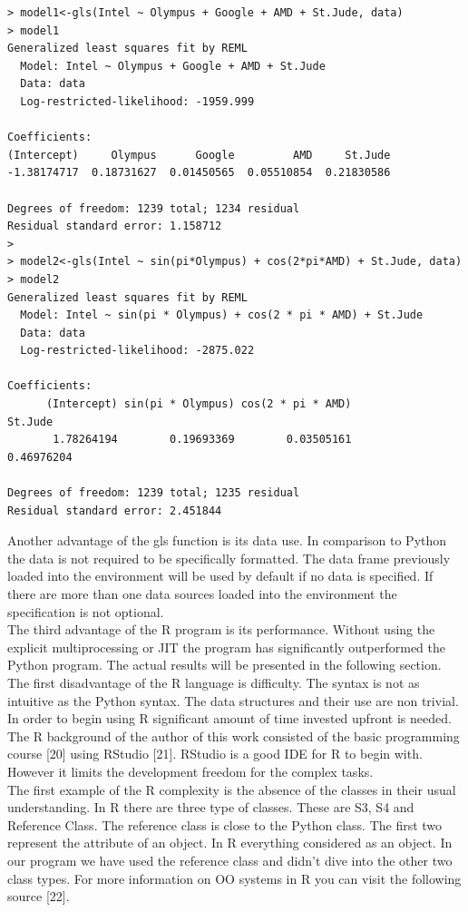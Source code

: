 \documentclass[
  twoside,
  12pt, a4paper,
  footinclude=true,
  headinclude=true,
  cleardoublepage=empty
]{article}
\begin{document}
\begin{verbatim}
> model1<-gls(Intel ~ Olympus + Google + AMD + St.Jude, data)
> model1
Generalized least squares fit by REML
  Model: Intel ~ Olympus + Google + AMD + St.Jude 
  Data: data 
  Log-restricted-likelihood: -1959.999

Coefficients:
(Intercept)     Olympus      Google         AMD     St.Jude 
-1.38174717  0.18731627  0.01450565  0.05510854  0.21830586 

Degrees of freedom: 1239 total; 1234 residual
Residual standard error: 1.158712
>
> model2<-gls(Intel ~ sin(pi*Olympus) + cos(2*pi*AMD) + St.Jude, data)
> model2
Generalized least squares fit by REML
  Model: Intel ~ sin(pi * Olympus) + cos(2 * pi * AMD) + St.Jude 
  Data: data 
  Log-restricted-likelihood: -2875.022

Coefficients:
      (Intercept) sin(pi * Olympus) cos(2 * pi * AMD)           St.Jude 
       1.78264194        0.19693369        0.03505161        0.46976204 

Degrees of freedom: 1239 total; 1235 residual
Residual standard error: 2.451844
\end{verbatim}
Another advantage of the gls function is its data use. In comparison to Python the data is not required to be specifically formatted. The data frame previously loaded into the environment will be used by default if no data is specified. If there are more than one data sources loaded into the environment the specification is not optional.\\
The third advantage of the R program is its performance. Without using the explicit multiprocessing or JIT the program has significantly outperformed the Python program. The actual results will be presented in the following section.\\
The first disadvantage of the R language is difficulty. The syntax is not as intuitive as the Python syntax. The data structures and their use are non trivial. In order to begin using R significant amount of time invested upfront is needed. The R background of the author of this work consisted of the basic programming course [20] using RStudio [21]. RStudio is a good IDE for R to begin with. However it limits the development freedom for the complex tasks.\\
The first example of the R complexity is the absence of the classes in their usual understanding. In R there are three type of classes. These are S3, S4 and Reference Class. The reference class is close to the Python class. The first two represent the attribute of an object. In R everything considered as an object. In our program we have used the reference class and didn't dive into the other two class types. For more information on OO systems in R you can visit the following source [22]. \\
\end{document}
